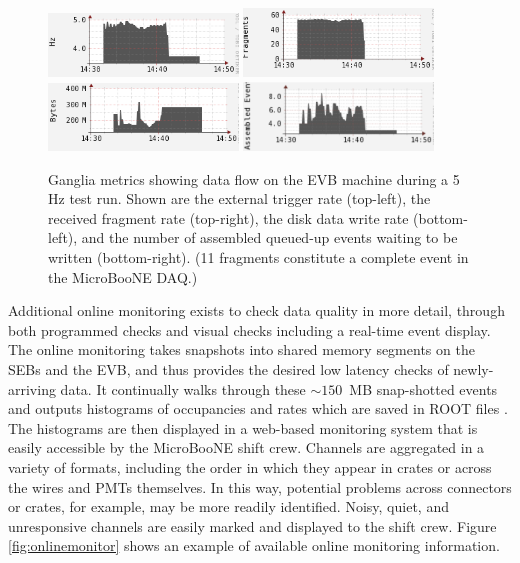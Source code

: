\begin{figure}
\centering
\includegraphics[width=0.45\textwidth]{./figures/ganglia_EXT_trigRate.png}
\includegraphics[width=0.45\textwidth]{./figures/ganglia_RECEIVEDfrag_rate.png}\\
\includegraphics[width=0.45\textwidth]{./figures/ganglia_WRITEdata_rate.png}
\includegraphics[width=0.45\textwidth]{./figures/ganglia_WRITEQUE_size.png}
\caption{Ganglia metrics showing data flow on the EVB machine during a 5 Hz test run. Shown are the external trigger rate (top-left), the received fragment rate (top-right), the disk data write rate (bottom-left), and the number of assembled queued-up events waiting to be written (bottom-right). (11 fragments constitute a complete event in the MicroBooNE DAQ.)}
\label{fig:ganglia}
\end{figure}

Additional online monitoring exists to check data quality in more detail, through both programmed checks and visual checks including a real-time event display. The online monitoring takes snapshots into shared memory segments on the SEBs and the EVB, and thus provides the desired low latency checks of newly-arriving data. It continually walks through these $\sim150$~MB snap-shotted events and outputs histograms of occupancies and rates which are saved in ROOT files \cite{BRUN199781}. The histograms are then displayed in a web-based monitoring system that is easily accessible by the MicroBooNE shift crew. Channels are aggregated in a variety of formats, including the order in which they appear in crates or across the wires and PMTs themselves. In this way, potential problems across connectors or crates, for example, may be more readily identified. Noisy, quiet, and unresponsive channels are easily marked and displayed to the shift crew.  Figure \ref{fig:onlinemonitor} shows an example of available online monitoring information.

